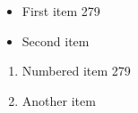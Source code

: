 \documentclass{article}
\begin{document}
\begin{itemize}
\item First item 279
\item Second item
\end{itemize}
\begin{enumerate}
\item Numbered item 279
\item Another item
\end{enumerate}
\end{document}
